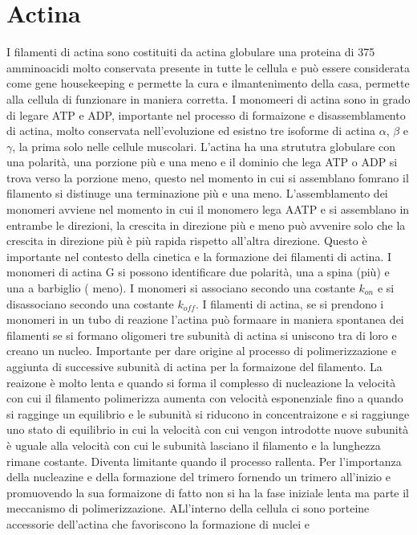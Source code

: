 \section{Actina}
I filamenti di actina sono costituiti da actina globulare una proteina di 375 amminoacidi molto conservata presente in tutte le cellula e pu\`o essere considerata come gene housekeeping
e permette la cura e ilmantenimento della casa, permette alla cellula di funzionare in maniera corretta. I monomeeri di actina sono in grado di legare ATP e ADP, importante nel 
processo di formaizone e disassemblamento di actina, molto conservata nell'evoluzione ed esistno tre isoforme di actina $\alpha$, $\beta$ e $\gamma$, la prima solo nelle cellule 
muscolari. L'actina ha una strututra globulare con una polarit\`a, una porzione pi\`u e una meno e il dominio che lega ATP o ADP si trova verso la porzione meno, questo nel momento in
cui si assemblano fomrano il filamento si distinuge una terminazione pi\`u e una meno. L'assemblamento dei monomeri avviene nel momento in cui il monomero lega AATP e si assemblano
in entrambe le direzioni, la crescita in direzione pi\`u e meno pu\`o avvenire solo che la crescita in direzione pi\`u \`e pi\`u rapida rispetto all'altra direzione. Questo \`e 
importante nel contesto della cinetica e la formazione dei filamenti di actina. I monomeri di actina G si possono identificare due polarit\`a, una a spina (pi\`u) e una a barbiglio (
meno). I monomeri si associano secondo una costante $k_{on}$ e si disassociano secondo una costante $k_{off}$. I filamenti di actina, se si prendono i monomeri in un tubo di reazione
l'actina pu\`o formaare in maniera spontanea dei filamenti se si formano oligomeri tre subunit\`a di actina si uniscono tra di loro e creano un nucleo. Importante per dare origine al
processo di polimerizzazione e aggiunta di successive subunit\`a di actina per la formaizone del filamento. La reaizone \`e molto lenta e quando si forma il complesso di nucleazione la
velocit\`a con cui il filamento polimerizza aumenta con velocit\`a esponenziale fino a quando si ragginge un equilibrio e le subunit\`a si riducono in concentraizone e si raggiunge uno
stato di equilibrio in cui la velocit\`a con cui vengon introdotte nuove subunit\`a \`e uguale alla velocit\`a con cui le subunit\`a lasciano il filamento e la lunghezza rimane costante. 
Diventa limitante quando il processo rallenta. Per l'importanza della nucleazine e della formazione del trimero fornendo un trimero all'inizio e promuovendo la sua formaizone di fatto non
si ha la fase iniziale lenta ma parte il meccanismo di polimerizzazione. ALl'interno della cellula ci sono porteine accessorie dell'actina che favoriscono la formazione di nuclei e
